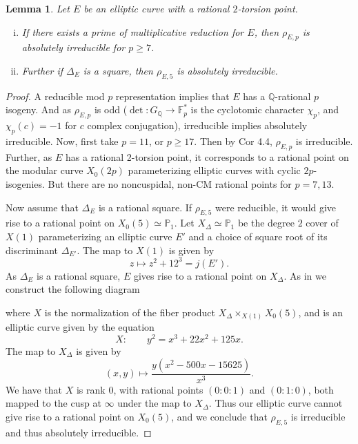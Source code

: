 \documentclass[12pt]{amsart}
\newtheorem{lem}[thm]{Lemma}
\theoremstyle{definition}
\theoremstyle{remark}
\def\F{{\mathbb F}}
\def\P{{{\mathbb P}}}
\def\Q{{\mathbb Q}}
\begin{document}
\begin{lem}\label{absirr}
Let $E$ be an elliptic curve with a rational $2$-torsion point.   
\begin{enumerate}[(i)]
\item If there exists a prime of multiplicative reduction for $E$, then $\rho_{E,p}$ is absolutely irreducible for $p \geq 7$.
\item Further if $\Delta_E$ is a square, then $\rho_{E,5}$ is absolutely irreducible.
\end{enumerate}
\end{lem}
\begin{proof}
A reducible mod $p$ representation implies that $E$ has a $\Q$-rational $p$ isogeny.  And as $\rho_{E,p}$ is odd ($\det \colon G_\Q \rightarrow \F_p^*$ is the cyclotomic character $\chi_p$, and $\chi_p(c)=-1$ for $c$ complex conjugation), irreducible implies absolutely irreducible.  
Now, first take $p =11$, or \mbox{$p \geq 17$}.  Then by \cite{mazur78} Cor 4.4, $\rho_{E,p}$ is irreducible.  Further, as $E$ has a rational 2-torsion point, it corresponds to a rational point on the modular curve $X_0(2p)$ parameterizing elliptic curves with cyclic $2p$-isogenies.  But there are no noncuspidal, non-CM rational points for $p = 7,13$.

Now assume that $\Delta_E$ is a rational square.  If $\rho_{E,5}$ were reducible, it would give rise to a rational point on $X_0(5) \simeq \P_1$.  Let $X_{\Delta} \simeq \P_1$ be the degree $2$ cover of $X(1)$ parameterizing an elliptic curve $E'$ and a choice of square root of its discriminant $\Delta_{E'}$.  The map to $X(1)$ is given by
\[z \mapsto z^2 + 12^3 = j(E'). \]
As $\Delta_E$ is a rational square, $E$ gives rise to a rational point on $X_{\Delta}$.
As in \cite{brown12} we construct the following diagram
\begin{center}
\end{center}
where $X$ is the normalization of the fiber product $X_{\Delta} \times_{X(1)} X_0(5)$, and is an elliptic curve given by the equation
\[X \colon \qquad  y^2 = x^3 + 22x^2 +125x .\]
The map to $X_{\Delta}$ is given by
\[ (x,y) \mapsto \frac{y(x^2-500x -15625)}{x^3}. \]
We have that $X$ is rank $0$, with rational points $(0:0:1)$ and $(0:1:0)$, both mapped to the cusp at $\infty$ under the map to $X_{\Delta}$. Thus our elliptic curve cannot give rise to a rational point on $X_0(5)$, and we conclude that $\rho_{E,5}$ is irreducible and thus absolutely irreducible. 
\end{proof}
\end{document}
